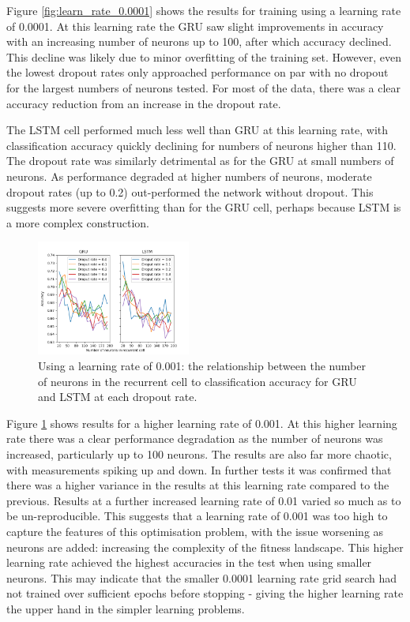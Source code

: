     Figure \ref{fig:learn_rate_0.0001} shows the results for training using a
    learning rate of 0.0001. At this learning rate the GRU saw slight improvements in
    accuracy with an increasing number of neurons up to 100, after which
    accuracy declined. This decline was likely due to minor overfitting of the
    training set. However, even the lowest dropout rates only approached
    performance on par with no dropout for the largest numbers of neurons
    tested. For most of the data, there was a clear accuracy reduction from an
    increase in the dropout rate.

    The LSTM cell performed much less well than GRU at this learning rate, with
    classification accuracy quickly declining for numbers of neurons higher than
    110. The dropout rate was similarly detrimental as for the GRU at
    small numbers of neurons. As performance degraded at higher numbers of
    neurons, moderate dropout rates (up to 0.2) out-performed the network without
    dropout. This suggests more severe overfitting than for the GRU cell,
    perhaps because LSTM is a more complex construction. 

    \begin{figure}[ht]
      \includegraphics[width=0.45\textwidth]{Figures/n_neurons_plot-0-001.png}
      \caption{Using a learning rate of 0.001: the relationship between the number of neurons in the recurrent
        cell to classification accuracy for GRU and LSTM at each dropout rate.}
      \label{fig:learn_rate_0.001}
    \end{figure}

    Figure \ref{fig:learn_rate_0.001} shows results for a higher learning rate
    of 0.001. At this higher learning rate there was a clear performance
    degradation as the number of neurons was increased, particularly up to 100
    neurons. The results are also far more chaotic, with measurements spiking up
    and down. In further tests it was confirmed that there was a higher variance in
    the results at this learning rate compared to the previous. Results at a
    further increased learning rate of 0.01 varied so much as to be
    un-reproducible. This suggests that a learning rate of 0.001 was too high to
    capture the features of this optimisation problem, with the issue worsening
    as neurons are added: increasing the complexity of the fitness landscape.
    This higher learning rate achieved the highest accuracies in the test when
    using smaller neurons. This may indicate that the smaller 0.0001 learning rate grid
    search had not trained over sufficient epochs before stopping - giving the
    higher learning rate the upper hand in the simpler learning problems.

